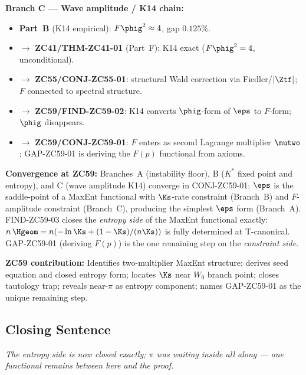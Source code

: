 \documentclass[12pt, a4paper]{article}
\begin{document}
\begin{genealogybox}[title={How ZC59's Key Objects Trace Back
  through the Z-Programme}]
\textbf{Branch C --- Wave amplitude / K14 chain:}
\begin{itemize}[leftmargin=2em, noitemsep]
\item \textbf{Part~B} (K14 empirical):
  $F\phig^2 \approx 4$, gap $0.125\%$.
\item $\to$ \textbf{ZC41/THM-ZC41-01} (Part~F):
  K14 exact ($F\phig^2 = 4$, unconditional).
\item $\to$ \textbf{ZC55/CONJ-ZC55-01}:
  structural Wald correction via Fiedler/$|\Ztf|$; $F$
  connected to spectral structure.
\item $\to$ \textbf{ZC59/FIND-ZC59-02}: K14 converts
  $\phig$-form of $\eps$ to $F$-form; $\phig$ disappears.
\item $\to$ \textbf{ZC59/CONJ-ZC59-01}: $F$ enters as
  second Lagrange multiplier $\mutwo$; GAP-ZC59-01 is
  deriving the $F(p)$ functional from axioms.
\end{itemize}

\textbf{Convergence at ZC59:}
Branches~A (instability floor), B ($K^*$ fixed point and entropy),
and C (wave amplitude K14) converge in CONJ-ZC59-01: $\eps$ is
the saddle-point of a MaxEnt functional with $\Ks$-rate
constraint (Branch~B) and $F$-amplitude constraint (Branch~C),
producing the simplest $\eps$ form (Branch~A).
FIND-ZC59-03 closes the \emph{entropy side} of the MaxEnt
functional exactly: $n\,\Hgeom = n(-\ln\Ks + (1-\Ks)/(n\Ks))$
is fully determined at T-canonical.  GAP-ZC59-01 (deriving
$F(p)$) is the one remaining step on the \emph{constraint side}.

\textbf{ZC59 contribution:} Identifies two-multiplier MaxEnt
structure; derives seed equation and closed entropy form;
locates $\Ks$ near $W_0$ branch point; closes tautology trap;
reveals near-$\pi$ as entropy component; names GAP-ZC59-01
as the unique remaining step.
\end{genealogybox}

\subsection{Closing Sentence}

\bigskip
\begin{center}
\textit{The entropy side is now closed exactly;
  $\pi$ was waiting inside all along ---
  one functional remains between here and the proof.}
\end{center}
\end{document}
